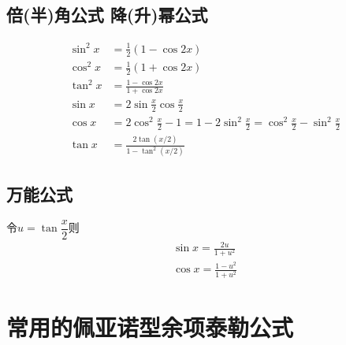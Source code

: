 \documentclass[10pt,a4paper]{article}
\begin{document}
\subsection{倍(半)角公式 \quad 降(升)幂公式}
\begin{align}
    \sin^2x & =\frac{1}{2}(1-\cos 2x)                                                        \\[7pt]
    \cos^2x & =\frac{1}{2}(1+\cos 2x)                                                        \\[7pt]
    \tan^2x & =\frac{1-\cos 2x}{1+\cos 2x}                                                   \\[7pt]
    \sin x  & =2\sin\frac{x}{2}\cos\frac{x}{2}                                               \\[7pt]
    \cos x  & =2\cos^2\frac{x}{2}-1=1-2\sin^2\frac{x}{2}=\cos^2\frac{x}{2}-\sin^2\frac{x}{2} \\[7pt]
    \tan x  & =\frac{2\tan(x/2)}{1-\tan^2(x/2)}
\end{align}
\subsection{万能公式}
令$ u=\tan\dfrac{x}{2} $则
\begin{align}
    \sin x=\frac{2u}{1+u^2} \\[7pt]
    \cos x=\frac{1-u^2}{1+u^2}
\end{align}
\section{常用的佩亚诺型余项泰勒公式}
\end{document}

